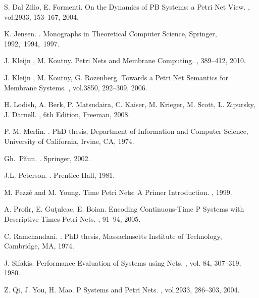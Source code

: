 \documentclass{eptcs}
\begin{document}
\begin{thebibliography}{1}
S. Dal Zilio, E. Formenti.
\newblock On the Dynamics of PB Systems: a Petri Net View.
, vol.2933,
153--167, 2004.
\newblock {}

K. Jensen.
.
\newblock Monographs in Theoretical Computer Science, Springer,
1992,~1994,~1997.

J. Kleijn , M. Koutny.
\newblock Petri Nets and Membrane Computing.
, 389--412,
2010.

J. Kleijn , M. Koutny, G. Rozenberg.
\newblock Towards a Petri Net Semantics for Membrane Systems.
, vol.3850,
292--309, 2006.
\newblock {}

H. Lodish, A. Berk, P. Matsudaira, C. Kaiser, M. Krieger, M. Scott,
L. Zipursky, J. Darnell.
, 6th Edition, Freeman, 2008.

P. M. Merlin.
.
\newblock PhD thesis, Department of Information and Computer Science,
University of California, Irvine, CA, 1974.

Gh.~P\u aun.
.
\newblock Springer, 2002.
\newblock {}

J.L. Peterson.
.
\newblock Prentice-Hall, 1981.

M. Pezz\'e and M. Young.
\newblock Time Petri Nets: A Primer Introduction.
, 1999.

A. Profir, E. Gu\c tuleac, E. Boian.
\newblock Encoding Continuous-Time P Systems with Descriptive Times Petri
Nets.
, 91--94, 2005.

C. Ramchandani.
.
\newblock PhD thesis, Massachusetts Institute of Technology, Cambridge, MA,
1974.

J. Sifakis.
\newblock Performance Evaluation of Systems using Nets.
, vol. 84, 307--319, 1980.
\newblock {}

Z. Qi, J. You, H. Mao.
\newblock P Systems and Petri Nets.
, vol.2933,
286--303, 2004.
\newblock {}

\end{thebibliography}
\end{document}
